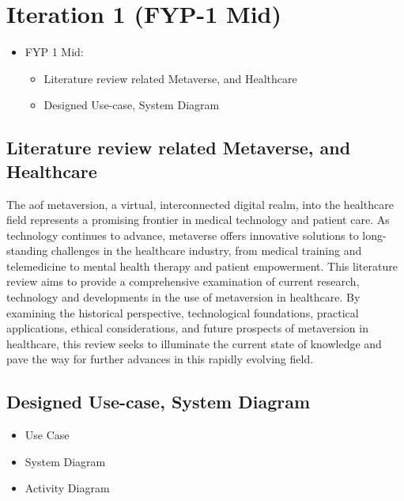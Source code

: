 \chapter{Iteration 1 (FYP-1 Mid)}
\label{ch:iter1}
\begin{itemize}
    \item FYP 1 Mid: 
    \begin{itemize}
    \item Literature review related Metaverse, and Healthcare
    \item Designed Use-case, System Diagram
    \end{itemize}
\end{itemize}


\section{Literature review related Metaverse, and Healthcare}
{The aof metaversion, a virtual, interconnected digital realm, into the healthcare field represents a promising frontier in medical technology and patient care. As technology continues to advance, metaverse offers innovative solutions to long-standing challenges in the healthcare industry, from medical training and telemedicine to mental health therapy and patient empowerment. This literature review aims to provide a comprehensive examination of current research, technology and developments in the use of metaversion in healthcare. By examining the historical perspective, technological foundations, practical applications, ethical considerations, and future prospects of metaversion in healthcare, this review seeks to illuminate the current state of knowledge and pave the way for further advances in this rapidly evolving field.
}

\section{Designed Use-case, System Diagram}
\begin{itemize}
    \item Use Case 
    \item System Diagram
    \item Activity Diagram
\end{itemize}


